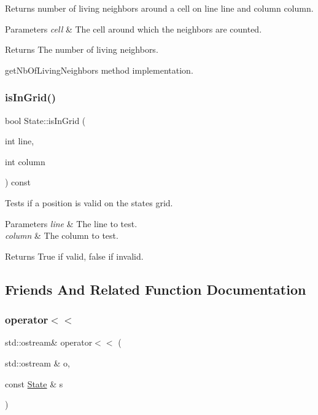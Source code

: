 Returns number of living neighbors around a cell on line line and column column.


\begin{DoxyParams}{Parameters}
{\em cell} & The cell around which the neighbors are counted. \\
\hline
\end{DoxyParams}
\begin{DoxyReturn}{Returns}
The number of living neighbors.
\end{DoxyReturn}
get\+Nb\+Of\+Living\+Neighbors method implementation. \mbox{\label{class_state_aef7e65c5de780a3e933e1d145c67965e}} 
\subsubsection{\texorpdfstring{is\+In\+Grid()}{isInGrid()}}
{\footnotesize\ttfamily bool State\+::is\+In\+Grid (\begin{DoxyParamCaption}\item[{int}]{line,  }\item[{int}]{column }\end{DoxyParamCaption}) const\hspace{0.3cm}{\ttfamily [inline]}}

Tests if a position is valid on the state\textquotesingle{}s grid.


\begin{DoxyParams}{Parameters}
{\em line} & The line to test. \\
\hline
{\em column} & The column to test. \\
\hline
\end{DoxyParams}
\begin{DoxyReturn}{Returns}
True if valid, false if invalid. 
\end{DoxyReturn}


\subsection{Friends And Related Function Documentation}
\mbox{\label{class_state_aa1b8f65fa23e0c5f68a6c236ef7e5653}} 
\subsubsection{\texorpdfstring{operator$<$$<$}{operator<<}}
{\footnotesize\ttfamily std\+::ostream\& operator$<$$<$ (\begin{DoxyParamCaption}\item[{std\+::ostream \&}]{o,  }\item[{const \mbox{\hyperlink{class_state}{State}} \&}]{s }\end{DoxyParamCaption})\hspace{0.3cm}{\ttfamily [friend]}}

